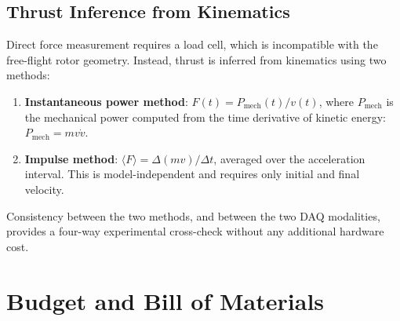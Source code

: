 \documentclass[12pt,letterpaper]{article}
\begin{document}
\subsection{Thrust Inference from Kinematics}

Direct force measurement requires a load cell, which is incompatible with the free-flight
rotor geometry. Instead, thrust is inferred from kinematics using two methods:

\begin{enumerate}[noitemsep]
  \item \textbf{Instantaneous power method}: $F(t) = P_{\mathrm{mech}}(t) / v(t)$,
    where $P_{\mathrm{mech}}$ is the mechanical power computed from the time derivative
    of kinetic energy: $P_{\mathrm{mech}} = mv\dot{v}$.
  \item \textbf{Impulse method}: $\langle F \rangle = \Delta(mv) / \Delta t$, averaged
    over the acceleration interval. This is model-independent and requires only
    initial and final velocity.
\end{enumerate}

Consistency between the two methods, and between the two DAQ modalities, provides a
four-way experimental cross-check without any additional hardware cost.

\section{Budget and Bill of Materials}
\end{document}
